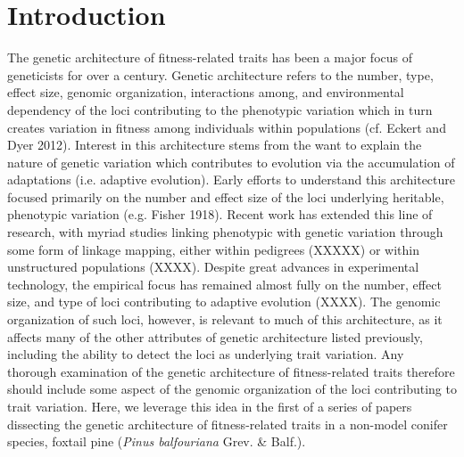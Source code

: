 \documentclass[11pt]{article}
\begin{document}
\section{Introduction}
The genetic architecture of fitness-related traits has been a major focus of geneticists for over a century. 
Genetic architecture refers to the number, type, effect size, genomic organization, 
interactions among, and environmental dependency 
of the loci contributing to the phenotypic variation which in turn creates variation in fitness among 
individuals within populations (cf. Eckert and Dyer 2012).
Interest in this architecture stems from the want to explain the nature of 
genetic variation which contributes to evolution 
via the accumulation of adaptations (i.e. adaptive evolution). Early efforts to understand 
this architecture focused primarily on the number and effect size of the loci underlying heritable, 
phenotypic variation (e.g. Fisher 1918). 
Recent work has extended this line of research, with myriad studies linking 
phenotypic with genetic variation through 
some form of linkage mapping, either within pedigrees (XXXXX) or within unstructured populations (XXXX). 
Despite great advances in experimental technology, the empirical focus has remained almost 
fully on the number, effect size, and type of loci
contributing to adaptive evolution (XXXX). The genomic organization of such loci, 
however, is relevant to much of this architecture, as 
it affects many of the other attributes of genetic architecture listed previously, 
including the ability to detect the loci as underlying trait variation. 
Any thorough examination of the genetic architecture of fitness-related traits 
therefore should include some aspect of the genomic organization of the loci
contributing to trait variation. Here, we leverage this idea in the first of a series of papers 
dissecting the genetic architecture of fitness-related
traits in a non-model conifer species, foxtail pine (\textit{Pinus balfouriana} Grev. \& Balf.).
\end{document}
